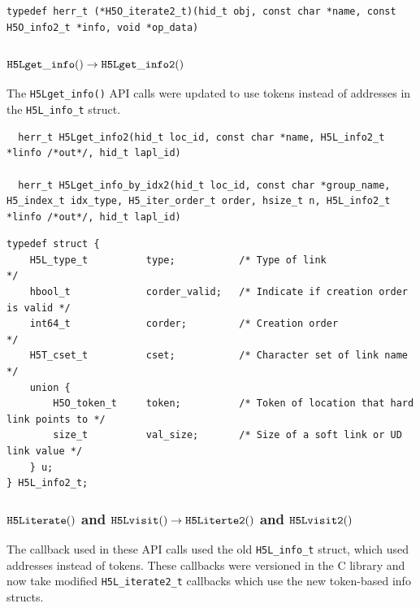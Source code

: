 \begin{lstlisting}
typedef herr_t (*H5O_iterate2_t)(hid_t obj, const char *name, const H5O_info2_t *info, void *op_data)
\end{lstlisting}


\subsubsection{${\tt H5Lget\_info()} \rightarrow {\tt H5Lget\_info2()}$}

The {\tt H5Lget\_info()} API calls were updated to use tokens instead
of addresses in the {\tt H5L\_info\_t} struct.

\begin{lstlisting}
  herr_t H5Lget_info2(hid_t loc_id, const char *name, H5L_info2_t *linfo /*out*/, hid_t lapl_id)

  herr_t H5Lget_info_by_idx2(hid_t loc_id, const char *group_name, H5_index_t idx_type, H5_iter_order_t order, hsize_t n, H5L_info2_t *linfo /*out*/, hid_t lapl_id)
\end{lstlisting}

\begin{lstlisting}
typedef struct {                                                                 
    H5L_type_t          type;           /* Type of link                   */     
    hbool_t             corder_valid;   /* Indicate if creation order is valid */
    int64_t             corder;         /* Creation order                 */     
    H5T_cset_t          cset;           /* Character set of link name     */     
    union {                                                                      
        H5O_token_t     token;          /* Token of location that hard link points to */
        size_t          val_size;       /* Size of a soft link or UD link value */
    } u;                                                                         
} H5L_info2_t;
\end{lstlisting}


\subsubsection{${\tt H5Literate()}$ and ${\tt H5Lvisit()}\rightarrow {\tt H5Literte2()}$ and ${\tt H5Lvisit2()}$}

The callback used in these API calls used the old {\tt H5L\_info\_t} struct, which
used addresses instead of tokens. These callbacks were versioned in the C library
and now take modified {\tt H5L\_iterate2\_t} callbacks which use the new token-based
info structs.

